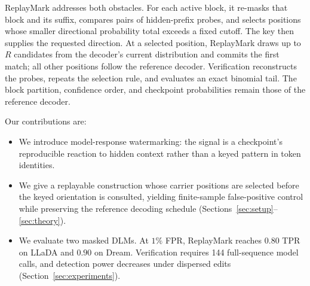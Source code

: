 ReplayMark addresses both obstacles. For each active block, it re-masks that block and its suffix,
compares pairs of hidden-prefix probes, and selects positions whose smaller directional probability
total exceeds a fixed cutoff. The key then supplies the requested direction. At a selected position,
ReplayMark draws up to $R$ candidates from the decoder's current distribution and commits the first
match; all other positions follow the reference decoder. Verification reconstructs the probes,
repeats the selection rule, and evaluates an exact binomial tail. The block partition, confidence
order, and checkpoint probabilities remain those of the reference decoder.

Our contributions are:
\begin{itemize}[leftmargin=1.2em,itemsep=1pt,topsep=2pt]
\item We introduce model-response watermarking: the signal is a checkpoint's reproducible reaction
to hidden context rather than a keyed pattern in token identities.
\item We give a replayable construction whose carrier positions are selected before the keyed
orientation is consulted, yielding finite-sample false-positive control while preserving the
reference decoding schedule (Sections~\ref{sec:setup}--\ref{sec:theory}).
\item We evaluate two masked DLMs. At $1\%$ FPR, ReplayMark reaches $0.80$ TPR on LLaDA and
$0.90$ on Dream. Verification requires 144 full-sequence model calls, and detection power
decreases under dispersed edits (Section~\ref{sec:experiments}).
\end{itemize}
